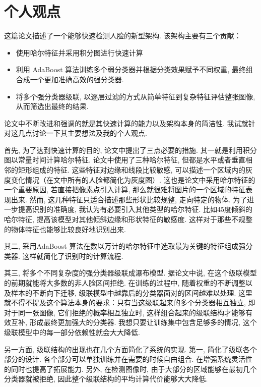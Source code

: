 \documentclass[utf8]{ctexart}
\begin{document}
\section*{个人观点}
这篇论文描述了一个能够快速检测人脸的新型架构. 该架构主要有三个贡献：
\begin{itemize}
  \item 使用哈尔特征并采用积分图进行快速计算
  \item 利用 AdaBoost 算法训练多个弱分类器并根据分类效果赋予不同权重, 最终组合成一个更加准确高效的强分类器. 
  \item 将多个强分类器级联, 以逐层过滤的方式从简单特征到复杂特征评估整张图像, 从而筛选出最终的结果. 
\end{itemize}

论文中不断改进和强调的就是其快速计算的能力以及架构本身的简洁性. 我试就针对这几点讨论一下其主要想法及我的个人观点.

首先, 为了达到快速计算的目的, 论文中提出了三点必要的措施. 其一就是利用积分图以常量时间计算哈尔特征. 论文中使用了三种哈尔特征, 但都是水平或者垂直相邻的矩形组成的特征. 这些特征对边缘和线段比较敏感, 可以描述一个区域内的灰度变化情况（在文中所有的人脸都简化为灰度图）. 这也是论文中采用哈尔特征的一个重要原因, 若直接把像素点引入计算, 那么就很难将图片的一个区域的特征表现出来. 然而, 这几种特征只适合描述那些形状比较规整, 走向特定的物体. 为了进一步提高识别的准确度, 我认为有必要引入其他类型的哈尔特征. 比如45度倾斜的哈尔特征, 提高该模型对其他倾斜边缘和形状特征的敏感度. 这样对于那些不规整的物体特征也能够比较良好地识别出来.

其二, 采用AdaBoost 算法在数以万计的哈尔特征中选取最为关键的特征组成强分类器. 这样就简化了识别时的计算流程.

其三, 将多个不同复杂度的强分类器级联成瀑布模型. 据论文中说, 在这个级联模型的前期就能将大多数的非人脸区间拒绝. 在训练的过程中, 随着权重的不断调整以及样本的不断向下迁移, 级联模型中越靠后的分类器面对的区间越难以处理. 这里就不得不提及这个算法本身的要求：只有当这级联起来的多个分类器相互独立, 即对于同一张图像, 它们拒绝的概率相互独立时, 这样组合起来的级联结构才能够有效互补, 形成最终更加强大的分类器. 我想只要让训练集中包含足够多的情况, 这个级联模型中的每一部分依赖性就会大大降低.

另一方面, 级联结构的出现也在几个方面简化了系统的实现. 第一, 简化了级联各个部分的设计. 各个部分可以单独训练并在需要的时候自由组合. 在增强系统灵活性的同时也提高了拓展能力. 另外, 在检测图像时, 由于大部分的区域能够在最初几个分类器就被拒绝, 因此整个级联结构的平均计算代价能够大大降低. 
\end{document}
